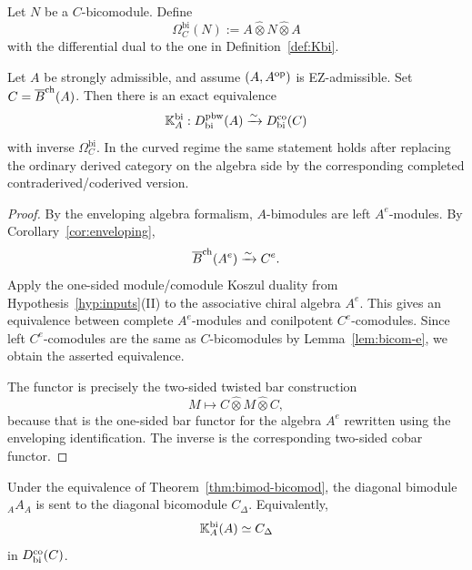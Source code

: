\begin{definition}
Let $N$ be a $C$-bicomodule. Define
\[
\Omega_C^{\mathrm{bi}}(N):=A\widehat\otimes N\widehat\otimes A
\]
with the differential dual to the one in Definition~\ref{def:Kbi}.
\end{definition}

\begin{theorem}
\ClaimStatusProvedHere
\label{thm:bimod-bicomod}
Let $A$ be strongly admissible, and assume $(A,A^{\mathrm{op}})$ is EZ-admissible.
Set $C=\overline{B}^{\mathrm{ch}}(A)$.
Then there is an exact equivalence
\[
\mathbb{K}_A^{\mathrm{bi}}:D^{\mathrm{pbw}}_{\mathrm{bi}}(A)\xrightarrow{\sim}D^{\mathrm{co}}_{\mathrm{bi}}(C)
\]
with inverse $\Omega_C^{\mathrm{bi}}$. In the curved regime the same statement holds after replacing
the ordinary derived category on the algebra side by the corresponding completed
contra\-derived/coderived version.
\end{theorem}

\begin{proof}
By the enveloping algebra formalism, $A$-bimodules are left $A^e$-modules.
By Corollary~\ref{cor:enveloping},
\[
\overline{B}^{\mathrm{ch}}(A^e)\xrightarrow{\sim} C^e.
\]
Apply the one-sided module/comodule Koszul duality from Hypothesis~\ref{hyp:inputs}(II) to the
associative chiral algebra $A^e$. This gives an equivalence between complete $A^e$-modules and
conilpotent $C^e$-comodules. Since left $C^e$-comodules are the same as $C$-bicomodules by
Lemma~\ref{lem:bicom-e}, we obtain the asserted equivalence.

The functor is precisely the two-sided twisted bar construction
\[
M\longmapsto C\widehat\otimes M\widehat\otimes C,
\]
because that is the one-sided bar functor for the algebra $A^e$ rewritten using the enveloping
identification. The inverse is the corresponding two-sided cobar functor.
\end{proof}

\begin{theorem}
\ClaimStatusProvedHere
\label{thm:diagonal}
Under the equivalence of Theorem~\ref{thm:bimod-bicomod}, the diagonal bimodule ${}_A A_A$ is sent
to the diagonal bicomodule $C_\Delta$. Equivalently,
\[
\mathbb{K}_A^{\mathrm{bi}}(A)\simeq C_\Delta
\]
in $D^{\mathrm{co}}_{\mathrm{bi}}(C)$.
\end{theorem}

